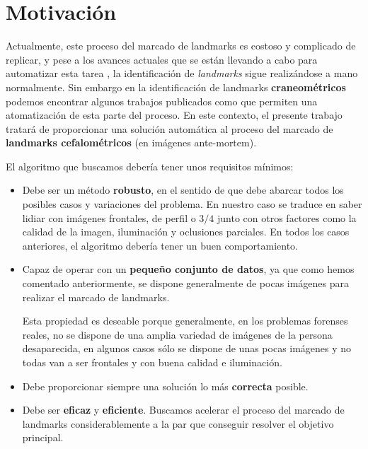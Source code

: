 \medskip 


\section{Motivación}

Actualmente, este proceso del marcado de landmarks es costoso y complicado de replicar, y pese a los avances actuales que se están llevando a cabo para automatizar esta tarea \cite{Huete2015PastPA}, la identificación de \textit{landmarks} sigue realizándose a mano normalmente. Sin embargo en la identificación de landmarks \textbf{craneométricos} podemos encontrar algunos trabajos publicados como \cite{bermejo2021automatic} que permiten una atomatización de esta parte del proceso. En este contexto, el presente trabajo tratará de proporcionar una solución automática al proceso del marcado de \textbf{landmarks cefalométricos} (en imágenes ante-mortem).

\medskip

\noindent El algoritmo que buscamos debería tener unos requisitos mínimos: 

\begin{itemize}
    \item Debe ser un método \textbf{robusto}, en el sentido de que debe abarcar todos los posibles casos y variaciones del problema. En nuestro caso se traduce en saber lidiar con imágenes frontales, de perfil o $3/4$ junto con otros factores como la calidad de la imagen, iluminación y oclusiones parciales. En todos los casos anteriores, el algoritmo debería tener un buen comportamiento.
    \item Capaz de operar con un \textbf{pequeño conjunto de datos}, ya que como hemos comentado anteriormente, se dispone generalmente de pocas imágenes para realizar el marcado de landmarks.
    
    \medskip

    \noindent Esta propiedad es deseable porque generalmente, en los problemas forenses reales, no se dispone de una amplia variedad de imágenes de la persona desaparecida, en algunos casos sólo se dispone de unas pocas imágenes y no todas van a ser frontales y con buena calidad e iluminación.

    \item Debe proporcionar siempre una solución lo más \textbf{correcta} posible.  
    
    \item Debe ser \textbf{eficaz} y \textbf{eficiente}. Buscamos acelerar el proceso del marcado de landmarks considerablemente a la par que conseguir resolver el objetivo principal.
\end{itemize}

